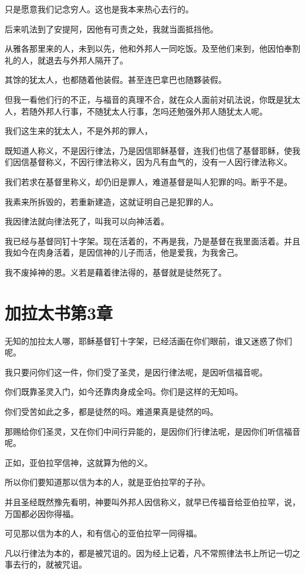 \documentclass[12pt,oneside]{book}
\begin{document}
只是愿意我们记念穷人。这也是我本来热心去行的。

后来叽法到了安提阿，因他有可责之处，我就当面抵挡他。

从雅各那里来的人，未到以先，他和外邦人一同吃饭。及至他们来到，他因怕奉割礼的人，就退去与外邦人隔开了。

其馀的犹太人，也都随着他装假。甚至连巴拿巴也随夥装假。

但我一看他们行的不正，与福音的真理不合，就在众人面前对矶法说，你既是犹太人，若随外邦人行事，不随犹太人行事，怎吗还勉强外邦人随犹太人呢。

我们这生来的犹太人，不是外邦的罪人，

既知道人称义，不是因行律法，乃是因信耶稣基督，连我们也信了基督耶稣，使我们因信基督称义，不因行律法称义，因为凡有血气的，没有一人因行律法称义。

我们若求在基督里称义，却仍旧是罪人，难道基督是叫人犯罪的吗。断乎不是。

我素来所拆毁的，若重新建造，这就证明自己是犯罪的人。

我因律法就向律法死了，叫我可以向神活着。

我已经与基督同钉十字架。现在活着的，不再是我，乃是基督在我里面活着。并且我如今在肉身活着，是因信神的儿子而活，他是爱我，为我舍己。

我不废掉神的恩。义若是藉着律法得的，基督就是徒然死了。

\chapter{加拉太书第3章}
无知的加拉太人哪，耶稣基督钉十字架，已经活画在你们眼前，谁又迷惑了你们呢。

我只要问你们这一件，你们受了圣灵，是因行律法呢，是因听信福音呢。

你们既靠圣灵入门，如今还靠肉身成全吗。你们是这样的无知吗。

你们受苦如此之多，都是徒然的吗。难道果真是徒然的吗。

那赐给你们圣灵，又在你们中间行异能的，是因你们行律法呢，是因你们听信福音呢。

正如，亚伯拉罕信神，这就算为他的义。

所以你们要知道那以信为本的人，就是亚伯拉罕的子孙。

并且圣经既然豫先看明，神要叫外邦人因信称义，就早已传福音给亚伯拉罕，说，万国都必因你得福。

可见那以信为本的人，和有信心的亚伯拉罕一同得福。

凡以行律法为本的，都是被咒诅的。因为经上记着，凡不常照律法书上所记一切之事去行的，就被咒诅。
\end{document}
